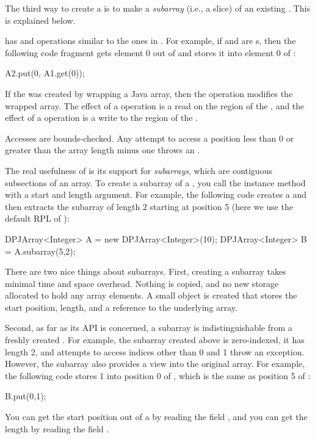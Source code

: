 The third way to create a  is to make a \emph{subarray}
(i.e., a slice) of an existing .  This is explained
below.

  has  and
 operations similar to the ones in .
For example, if  and  are s, then the
following code fragment gets element 0 out of  and stores it
into element 0 of :
%
\begin{dpjlisting}
A2.put(0, A1.get(0));
\end{dpjlisting}
%
If the  was created by wrapping a Java array, then the
 operation modifies the wrapped array.  The effect of a
 operation is a read on the region of the , and
the effect of a  operation is a write to the region of the
.

Accesses are bounds-checked.  Any attempt to access a position less
than 0 or greater than the array length minus one throws an
.

 The real usefulness of  is its
support for \emph{subarrays}, which are contiguous subsections of an
array.  To create a subarray of a , you call the
 instance method with a start and length argument.  For
example, the following code creates a  and then extracts
the subarray of length 2 starting at position 5 (here we use the
default RPL of ):
%
\begin{dpjlisting}
DPJArray<Integer> A = new DPJArray<Integer>(10);
DPJArray<Integer> B = A.subarray(5,2);
\end{dpjlisting}

There are two nice things about subarrays.  First, creating a subarray
takes minimal time and space overhead.  Nothing is copied, and no new
storage allocated to hold any array elements.  A small object is
created that stores the start position, length, and a reference to the
underlying array.

Second, as far as its API is concerned, a subarray is
indistinguishable from a freshly created .  For example,
the subarray created above is zero-indexed, it has length 2, and
attempts to access indices other than 0 and 1 throw an exception.
However, the subarray also provides a view into the original array.
For example, the following code stores 1 into position 0 of ,
which is the same as position 5 of :
%
\begin{dpjlisting}
B.put(0,1);
\end{dpjlisting}
%
You can get the start position out of a  by reading the
field , and you can get the length by reading the field
.


